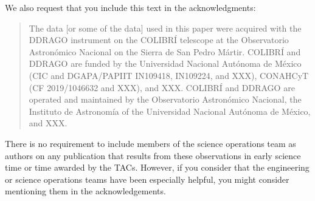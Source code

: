 We also request that you include this text in the acknowledgments:

\begin{quote}
The data [or some of the data] used in this paper were acquired with the DDRAGO instrument on the COLIBRÍ telescope at the Observatorio Astronómico Nacional on the Sierra de San Pedro Mártir. COLIBRÍ and DDRAGO are funded by the Universidad Nacional Autónoma de México (CIC and DGAPA/PAPIIT IN109418, IN109224, and XXX), CONAHCyT (CF 2019/1046632 and XXX), and XXX. COLIBRÍ and DDRAGO are operated and maintained by the Observatorio Astronómico Nacional, the Instituto de Astronomía of the Universidad Nacional Autónoma de México, and XXX.
\end{quote}

There is no requirement to include members of the science operations team as authors on any publication that results from these observations in early science time or time awarded by the TACs. However, if you consider that the engineering or science operations teams have been especially helpful, you might consider mentioning them in the acknowledgements.
